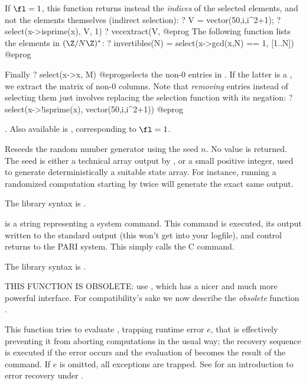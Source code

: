 {\noindent If $\fl = 1$, this function returns instead the \emph{indices} of
the selected elements, and not the elements themselves (indirect selection):
\bprog
? V = vector(50,i,i^2+1);
? select(x->isprime(x), V, 1)
? vecextract(V, %
@eprog\noindent
The following function lists the elements in $(\Z/N\Z)^*$:
\bprog
? invertibles(N) = select(x->gcd(x,N) == 1, [1..N])
@eprog

\noindent Finally
\bprog
? select(x->x, M)
@eprog\noindent selects the non-0 entries in . If the latter is a
, we extract the matrix of non-0 columns. Note that \emph{removing}
entries instead of selecting them just involves replacing the selection
function  with its negation:
\bprog
? select(x->!isprime(x), vector(50,i,i^2+1))
@eprog

. Also available
is ,
corresponding to $\fl = 1$.

\label{se:setrand}
Reseeds the random number generator using the seed $n$. No value is
returned. The seed is either a technical array output by , or a
small positive integer, used to generate deterministically a suitable state
array. For instance, running a randomized computation starting by
 twice will generate the exact same output.

The library syntax is .

\label{se:system}
 is a string representing a system command. This command is
executed, its output written to the standard output (this won't get into your
logfile), and control returns to the PARI system. This simply calls the C
 command.

The library syntax is .

\label{se:trap}
THIS FUNCTION IS OBSOLETE: use , which has a nicer and much
more powerful interface. For compatibility's sake we now describe the
\emph{obsolete} function .

This function tries to
evaluate , trapping runtime error $e$, that is effectively preventing
it from aborting computations in the usual way; the recovery sequence
 is executed if the error occurs and the evaluation of 
becomes the result of the command. If $e$ is omitted, all exceptions are
trapped. See  for an introduction to error recovery
under .

}
